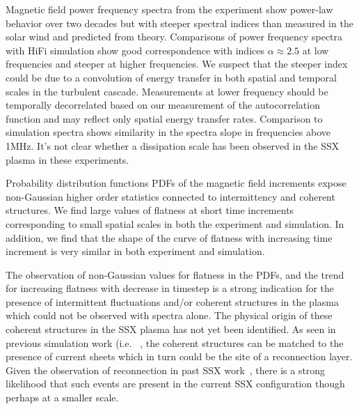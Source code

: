 \documentclass[12pt]{iopart}
\begin{document}
Magnetic field power frequency spectra from the experiment show power-law behavior over two decades but with steeper spectral indices than measured in the solar wind and predicted from theory. Comparisons of power frequency spectra with HiFi simulation show good correspondence with indices $\alpha \approx 2.5$ at low frequencies and steeper at higher frequencies.  We suspect that the steeper index could be due to a convolution of energy transfer in both spatial and temporal scales in the turbulent cascade. Measurements at lower frequency should be temporally decorrelated based on our measurement of the autocorrelation function and may reflect only spatial energy transfer rates. Comparison to simulation spectra shows similarity in the spectra slope in frequencies above 1MHz. It's not clear whether a dissipation scale has been observed in the SSX plasma in these experiments.

Probability distribution functions PDFs of the magnetic field increments expose non-Gaussian higher order statistics connected to intermittency and coherent structures.  We find large values of flatness at short time increments corresponding to small spatial scales in both the experiment and simulation.  In addition, we find that the shape of the curve of flatness with increasing time increment is very similar in both experiment and simulation.

The observation of non-Gaussian values for flatness in the PDFs, and the trend for increasing flatness with decrease in timestep is a strong indication for the presence of intermittent fluctuations and/or coherent structures in the plasma which could not be observed with spectra alone. The physical origin of these coherent structures in the SSX plasma has not yet been identified. As seen in previous simulation work (i.e. ~\cite{Servidio11b}, the coherent structures can be matched to the presence of current sheets which in turn could be the site of a reconnection layer. Given the observation of reconnection in past SSX work~\cite{Cothran09,Gray10}, there is a strong likelihood that such events are present in the current SSX configuration though perhaps at a smaller scale.
\end{document}
